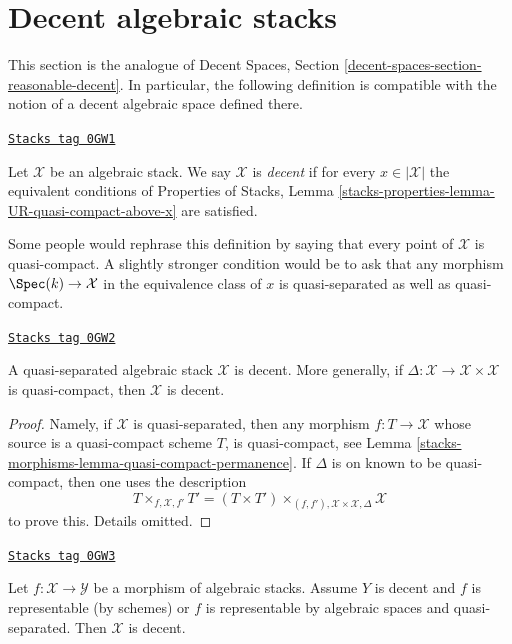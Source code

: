 \section{Decent algebraic stacks}
\label{stacks-morphisms-section-reasonable-decent}
This section is the analogue of
Decent Spaces, Section \ref{decent-spaces-section-reasonable-decent}.
In particular, the following definition is compatible with
the notion of a decent algebraic space defined there.

\begin{definition}[Decent]
\label{stacks-morphisms-definition-decent}
\href{https://stacks.math.columbia.edu/tag/0GW1}{\texttt{Stacks tag 0GW1}}

Let $\mathcal{X}$ be an algebraic stack. We say $\mathcal{X}$ is {\it decent}
if for every $x \in |\mathcal{X}|$ the equivalent conditions of
Properties of Stacks, Lemma
\ref{stacks-properties-lemma-UR-quasi-compact-above-x} are satisfied.
\end{definition}

Some people would rephrase this definition by saying that
every point of $\mathcal{X}$ is quasi-compact.
A slightly stronger condition would be to ask that any morphism
$\Spec(k) \to \mathcal{X}$ in the equivalence class of $x$ is
quasi-separated as well as quasi-compact.

\begin{lemma}
\label{stacks-morphisms-lemma-quasi-separated-decent}
\href{https://stacks.math.columbia.edu/tag/0GW2}{\texttt{Stacks tag 0GW2}}

A quasi-separated algebraic stack $\mathcal{X}$ is decent.
More generally, if $\Delta : \mathcal{X} \to \mathcal{X} \times \mathcal{X}$
is quasi-compact, then $\mathcal{X}$ is decent.
\end{lemma}

\begin{proof}
Namely, if $\mathcal{X}$ is quasi-separated, then
any morphism $f : T \to \mathcal{X}$ whose source is a
quasi-compact scheme $T$, is quasi-compact, see
Lemma \ref{stacks-morphisms-lemma-quasi-compact-permanence}.
If $\Delta$ is on known to be quasi-compact, then one uses the
description
$$
T \times_{f, \mathcal{X}, f'} T' =
(T \times T')
\times_{(f, f'), \mathcal{X} \times \mathcal{X}, \Delta}
\mathcal{X}
$$
to prove this. Details omitted.
\end{proof}

\begin{lemma}
\label{stacks-morphisms-lemma-representable-decent}
\href{https://stacks.math.columbia.edu/tag/0GW3}{\texttt{Stacks tag 0GW3}}

Let $f : \mathcal{X} \to \mathcal{Y}$ be a morphism
of algebraic stacks. Assume $Y$ is decent
and $f$ is representable (by schemes) or $f$ is representable
by algebraic spaces and quasi-separated.
Then $\mathcal{X}$ is decent.
\end{lemma}

